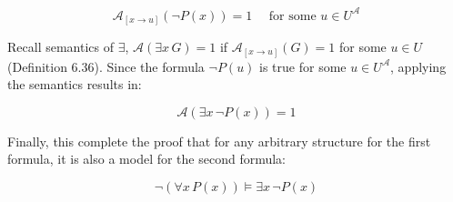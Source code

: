 \documentclass[unicode,11pt,a4paper,oneside,numbers=endperiod,openany]{scrartcl}
\def\struct{\mathcal{A}}
\begin{document}
\[
\struct_{[x \to u]}\left( 
    \neg P(x)
\right) = 1
\quad
\text{ for some } u \in U^\struct
\]

\noindent Recall semantics of \( \exists \),
\( \struct(\exists x \, G) = 1 \) if \( \struct_{[x \to u]}(G) = 1 \) for some \( u \in U \)
(Definition 6.36).
Since the formula \( \neg P(u) \) is true for some \( u \in U^\struct \),
applying the semantics results in:

\[
\struct\left( 
    \exists x \, \neg P(x)
\right) = 1
\]

\noindent Finally, this complete the proof that 
for any arbitrary structure for the first formula, it is also a model for the second formula:

\[
\neg \left( \forall x \, P(x) \right) \models \exists x \, \neg P(x)
\]
\end{document}
